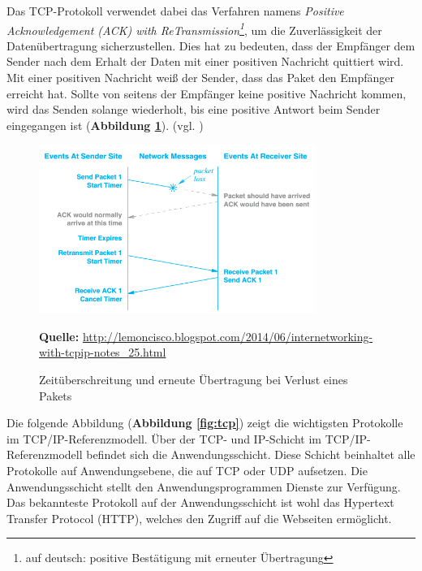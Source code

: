 Das TCP-Protokoll verwendet dabei das Verfahren namens \textit{Positive Acknowledgement (ACK) with ReTransmission\footnote{auf deutsch: positive Bestätigung mit erneuter Übertragung}}, um die Zuverlässigkeit der Datenübertragung sicherzustellen. Dies hat zu bedeuten, dass der Empfänger dem Sender nach dem Erhalt der Daten mit einer positiven Nachricht quittiert wird. Mit einer positiven Nachricht weiß der Sender, dass das Paket den Empfänger erreicht hat. Sollte von seitens der Empfänger keine positive Nachricht kommen, wird das Senden solange wiederholt, bis eine positive Antwort beim Sender eingegangen ist (\textbf {Abbildung \ref{fig:acknowledgement}}). (vgl. \cite{Hol2001})

\begin{figure}[H]
  \begin{center}
    \includegraphics[width=9cm]{img/Acknowledgement.png}
	\caption{Zeitüberschreitung und erneute Übertragung bei Verlust eines Pakets}
	\footnotesize\sffamily\textbf{Quelle:} \url{http://lemoncisco.blogspot.com/2014/06/internetworking-with-tcpip-notes_25.html} 
	\label{fig:acknowledgement}
  \end{center}   
\end{figure}

Die folgende Abbildung (\textbf {Abbildung \ref{fig:tcp}}) zeigt die wichtigsten Protokolle im TCP/IP-Referenzmodell. Über der TCP- und IP-Schicht im TCP/IP-Referenzmodell befindet sich die Anwendungsschicht. Diese Schicht beinhaltet alle Protokolle auf Anwendungsebene, die auf TCP oder UDP aufsetzen. Die Anwendungsschicht stellt den Anwendungsprogrammen Dienste zur Verfügung. Das bekannteste Protokoll auf der Anwendungsschicht ist wohl das Hypertext Transfer Protocol (HTTP), welches den Zugriff auf die Webseiten ermöglicht.

